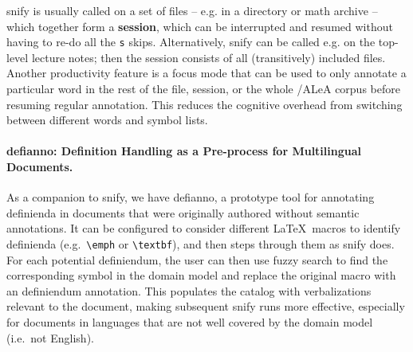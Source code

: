 \documentclass[runningheads]{llncs}
\def\edited#1{#1}
\newcommand\ALeA{\textsf{ALeA}\xspace}
\newcommand\snify{\textsf{snify}\xspace}
\newcommand\defianno{\textsf{defianno}\xspace}
\begin{document}
\snify is usually called on a set of files -- e.g. in a directory or math archive -- which
together form a \textbf{session}, which can be interrupted and resumed without having to
re-do all the \lstinline|s| skips. Alternatively, \snify can be called e.g. on the
top-level lecture notes; then the session consists of all (transitively) included
files. Another productivity feature is a focus mode that can be used to only annotate
a particular word in the rest of the file, session, or the whole \sTeX/\ALeA corpus before
resuming regular annotation. This reduces the cognitive overhead from switching between
different words and symbol lists.

\paragraph{\defianno: Definition Handling as a Pre-process for Multilingual Documents.}
As a companion to \snify, we have \defianno, a prototype tool for annotating definienda in
documents that were originally authored without semantic annotations.  It can be
configured to consider different \LaTeX\ macros to identify definienda (e.g.\
\lstinline[language={}]|\emph| or \lstinline[language={}]|\textbf|), and then steps
through them as \snify does.
For each potential definiendum, the user can then use fuzzy
search to find the corresponding symbol in the domain model
\edited{and replace the original macro with an} \sTeX \edited{definiendum annotation}.
This populates the catalog
with verbalizations relevant to the document, making subsequent \snify runs more
effective, especially for documents in languages that are not well covered by the domain
model (i.e.\ not English).

\end{document}
